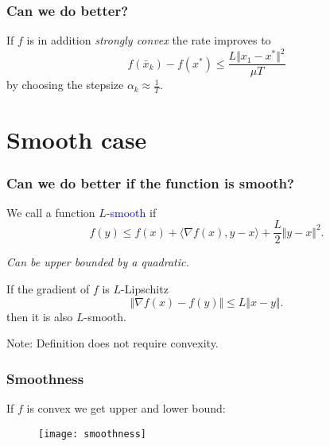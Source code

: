 \documentclass{beamer}
\begin{document}
\label{sec:}
\begin{frame}
  \frametitle{Can we do better?}
  If $f$ is in addition \emph{strongly convex} the rate improves to
  \begin{equation}
    f(\bar{x}_k) - f(x^*) \le \frac{L \Vert x_1-x^* \Vert^2}{\mu T}
  \end{equation}
  by choosing the stepsize $\alpha_k \approx \frac{1}{T}$.
\end{frame}


\section{Smooth case}%
\label{sec:}

\begin{frame}
  \frametitle{Can we do better if the function is smooth?}
  \begin{definition}
    We call a function $L$-\textcolor{blue}{smooth} if
    \begin{equation}
      f(y) \le f(x) + \langle \nabla f(x), y-x \rangle + \frac{L}{2} \Vert y-x \Vert^2.
    \end{equation}
  \end{definition}
  \begin{center}
    \textit{Can be upper bounded by a quadratic.}
  \end{center}
  \begin{lemma}%
    If the gradient of $f$ is $L$-Lipschitz
    \begin{equation}
      \Vert \nabla f(x)-f(y) \Vert \le L \Vert x-y \Vert.
    \end{equation}
    then it is also $L$-smooth.
  \end{lemma}
  Note: Definition does not require convexity.
\end{frame}


\begin{frame}
  \frametitle{Smoothness}
  If $f$ is convex we get upper and lower bound:

  \begin{figure}[ht]
    \centering
    \texttt{[image: smoothness]}
  \end{figure}
\end{frame}
\end{document}
